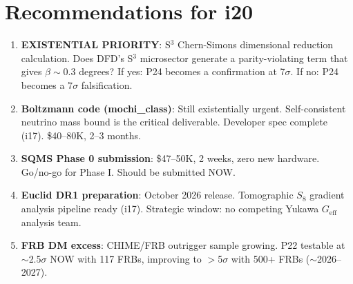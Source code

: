 \documentclass[11pt]{article}
\begin{document}
\section*{Recommendations for i20}

\begin{enumerate}
\item \textbf{EXISTENTIAL PRIORITY}: S$^3$ Chern-Simons dimensional reduction calculation.
  Does DFD's S$^3$ microsector generate a parity-violating term that gives $\beta \sim 0.3$ degrees?
  If yes: P24 becomes a confirmation at 7$\sigma$. If no: P24 becomes a 7$\sigma$ falsification.
\item \textbf{Boltzmann code (mochi\_class)}: Still existentially urgent.
  Self-consistent neutrino mass bound is the critical deliverable.
  Developer spec complete (i17). \$40--80K, 2--3 months.
\item \textbf{SQMS Phase 0 submission}: \$47--50K, 2 weeks, zero new hardware.
  Go/no-go for Phase I. Should be submitted NOW.
\item \textbf{Euclid DR1 preparation}: October 2026 release. Tomographic $S_8$
  gradient analysis pipeline ready (i17). Strategic window: no competing Yukawa $G_\text{eff}$
  analysis team.
\item \textbf{FRB DM excess}: CHIME/FRB outrigger sample growing. P22 testable at
  $\sim$2.5$\sigma$ NOW with 117 FRBs, improving to $>$5$\sigma$ with 500+ FRBs
  ($\sim$2026--2027).
\end{enumerate}
\end{document}
